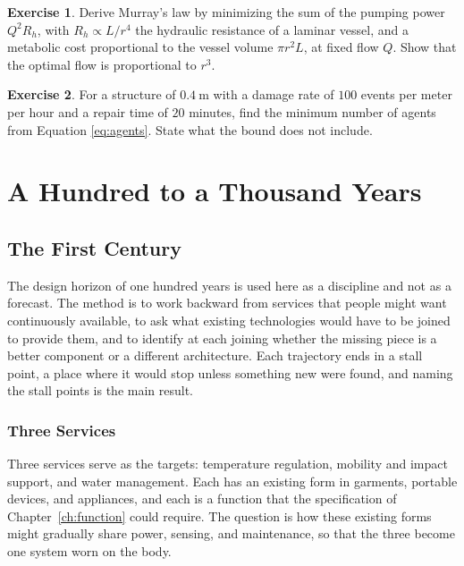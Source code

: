 \documentclass[11pt,openany]{book}
\theoremstyle{definition}
\newtheorem{exercise}{Exercise}[chapter]
\theoremstyle{remark}
\begin{document}
\begin{exercise}
Derive Murray's law by minimizing the sum of the pumping power $Q^{2}R_h$, with $R_h\propto L/r^{4}$ the hydraulic resistance of a laminar vessel, and a metabolic cost proportional to the vessel volume $\pi r^{2}L$, at fixed flow $Q$. Show that the optimal flow is proportional to $r^{3}$.
\end{exercise}

\begin{exercise}
For a structure of $0.4\ \mathrm{m}$ with a damage rate of $100$ events per meter per hour and a repair time of $20$ minutes, find the minimum number of agents from Equation \eqref{eq:agents}. State what the bound does not include.
\end{exercise}

\part{A Hundred to a Thousand Years}

\chapter{The First Century}
\label{ch:century}

The design horizon of one hundred years is used here as a discipline and not as a forecast. The method is to work backward from services that people might want continuously available, to ask what existing technologies would have to be joined to provide them, and to identify at each joining whether the missing piece is a better component or a different architecture. Each trajectory ends in a stall point, a place where it would stop unless something new were found, and naming the stall points is the main result.

\section{Three Services}

Three services serve as the targets: temperature regulation, mobility and impact support, and water management. Each has an existing form in garments, portable devices, and appliances, and each is a function that the specification of Chapter~\ref{ch:function} could require. The question is how these existing forms might gradually share power, sensing, and maintenance, so that the three become one system worn on the body.
\end{document}
